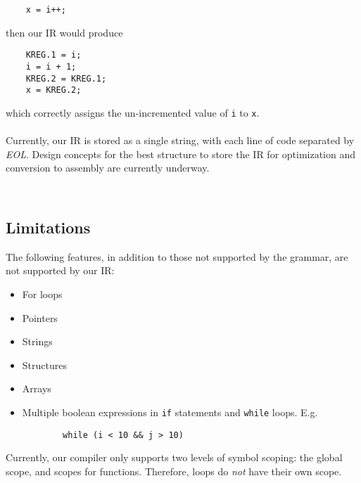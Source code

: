 \documentclass{scrartcl}
\begin{document}
\begin{verbatim}
    x = i++;
\end{verbatim}
then our IR would produce
\begin{verbatim}
    KREG.1 = i;
    i = i + 1;
    KREG.2 = KREG.1;
    x = KREG.2;
\end{verbatim}
which correctly assigns the un-incremented value of \verb|i| to \verb|x|.\\
\\
Currently, our IR is stored as a single string, with each line of code separated by \textit{EOL}. Design concepts for the best structure to store the IR for optimization and conversion to assembly are currently underway.
\begin{verbatim}
    
\end{verbatim}

\subsection{Limitations}
The following features, in addition to those not supported by the grammar, are not supported by our IR:
\begin{itemize}
    \item For loops
    \item Pointers
    \item Strings
    \item Structures
    \item Arrays
    \item Multiple boolean expressions in \verb|if| statements and \verb|while| loops. E.g. 
    \begin{verbatim}
        while (i < 10 && j > 10)
    \end{verbatim}
\end{itemize}
Currently, our compiler only supports two levels of symbol scoping: the global scope, and scopes for functions. Therefore, loops do \textit{not} have their own scope.
\end{document}
